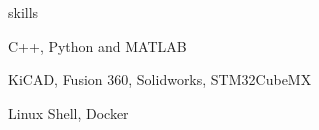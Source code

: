 \begin{section}{skills}
  
\begin{skills}

  \item {} {C++, Python and MATLAB}
  \item {} {KiCAD, Fusion 360, Solidworks, STM32CubeMX}
  \item {} {Linux Shell, Docker}

\end{skills}

\end{section}